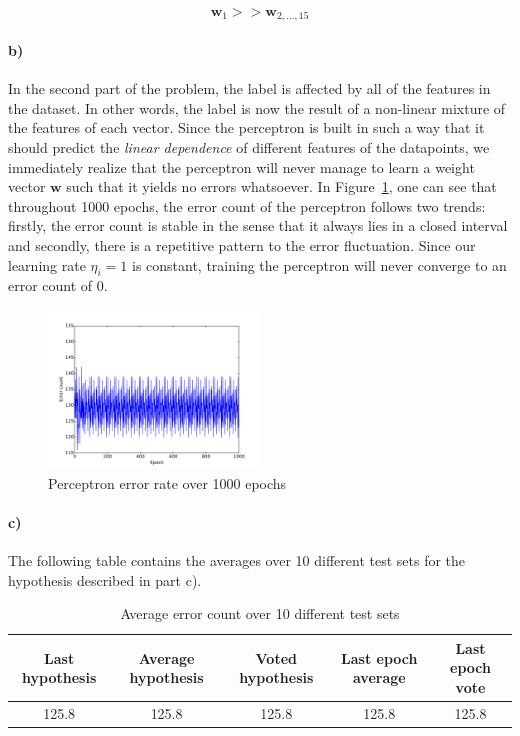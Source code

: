 \documentclass{article}
\begin{document}
\[
\mathbf{w}_1 >> \mathbf{w}_{2,\hdots,15} 
\]

\paragraph{b)}
In the second part of the problem, the label is affected by all of the features in the dataset. In other words, the label is now the result of a non-linear mixture of the features of each vector. Since the perceptron is built in such a way that it should predict the \textit{linear dependence} of different features of the datapoints, we immediately realize that the perceptron will never manage to learn a weight vector $\mathbf{w}$ such that it yields no errors whatsoever. In Figure~\ref{fig:prcp}, one can see that throughout 1000 epochs, the error count of the perceptron follows two trends: firstly, the error count is stable in the sense that it always lies in a closed interval and secondly, there is a repetitive pattern to the error fluctuation. Since our learning rate $\eta_i=1$ is constant, training the perceptron will never converge to an error count of 0.

\begin{figure}[H]
\centering\includegraphics[width=0.5\textwidth]{prcp.pdf}
\caption{Perceptron error rate over 1000 epochs}\label{fig:prcp}
\hfill
\end{figure}

\paragraph{c)}
The following table contains the averages over 10 different test sets for the hypothesis described in part c).

\begin{table}[H]
    \begin{center}
    \begin{tabular}{c|c|c|c|c}

		Last hypothesis & Average hypothesis & Voted hypothesis & Last epoch average & Last epoch vote \\
	   \hline		125.8 & 125.8 & 125.8 & 125.8 & 125.8
        \end{tabular}\caption{Average error count over 10 different test sets}
    \end{center}
\end{table}
\end{document}
